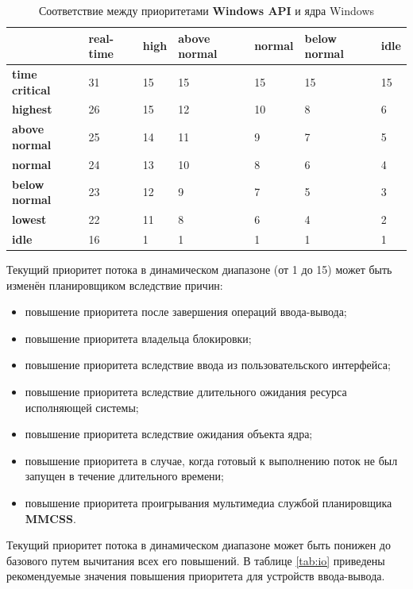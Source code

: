 \documentclass[a4paper,12pt]{extreport}
\begin{document}
\begin{table}[H]
	\caption{Соответствие между приоритетами \textbf{Windows API} и ядра Windows}
	\begin{center}
		\begin{tabular}{|l|p{45pt}|p{45pt}|p{45pt}|p{45pt}|p{45pt}|p{45pt}|}
			\hline
			{} & \textbf{real-time} & \textbf{high} & \textbf{above normal} & \textbf{normal} & \textbf{below normal} & \textbf{idle}\\
			\hline
			\textbf{time critical} & 31 & 15 & 15 & 15 & 15 & 15 \\
			\hline
			\textbf{highest} & 26 & 15 & 12 & 10 & 8 & 6 \\
			\hline
			\textbf{above normal} & 25 & 14 & 11 & 9 & 7 & 5 \\
			\hline
			\textbf{normal} & 24 & 13 & 10 & 8 & 6 & 4 \\
			\hline
			\textbf{below normal} & 23 & 12 & 9 & 7 & 5 & 3 \\
			\hline
			\textbf{lowest} & 22 & 11 & 8 & 6 & 4 & 2 \\
			\hline
			\textbf{idle} & 16 & 1 & 1 & 1 & 1 & 1 \\
			\hline
		\end{tabular}
	\end{center}
	\label{tbl:priority}
\end{table}


Текущий приоритет потока в динамическом диапазоне (от 1 до 15) может быть изменён планировщиком вследствие причин:

\begin{itemize}
	\item повышение приоритета после завершения операций ввода-вывода;
	\item повышение приоритета владельца блокировки;
	\item повышение приоритета вследствие ввода из пользовательского интерфейса;
	\item повышение приоритета вследствие длительного ожидания ресурса исполняющей системы;
	\item повышение приоритета вследствие ожидания объекта ядра;
	\item повышение приоритета в случае, когда готовый к выполнению поток не был запущен в течение длительного времени;
	\item повышение приоритета проигрывания мультимедиа службой планировщика \textbf{MMCSS}.
\end{itemize}

Текущий приоритет потока в динамическом диапазоне может быть понижен до базового путем вычитания всех его повышений. В таблице \ref{tab:io} приведены рекомендуемые значения повышения приоритета для устройств ввода-вывода.
\end{document}
